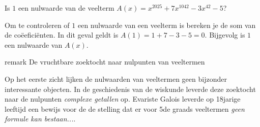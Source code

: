 \documentclass{ximera}
\begin{document}
\begin{exercise}
    Is \(1\) een nulwaarde van de veelterm \( A(x) = x^2025 + 7x^1042 - 3x^42 - 5\)? 
    \begin{oplossing}
    Om te controleren of \(1\) een nulwaarde van een veelterm is bereken je de som van de coëeficiënten. In dit geval geldt is \(A(1) = 1 + 7 - 3 - 5 = 0\). Bijgevolg is \(1\) een nulwaarde van \(A(x)\).  
    \end{oplossing}
\end{exercise}



\begin{expandable}{remark} De vruchtbare zoektocht naar nulpunten van veeltermen

    Op het eerste zicht lijken de nulwaarden van veeltermen geen bijzonder interessante objecten. In de geschiedenis van de wiskunde leverde deze zoektocht naar de nulpunten \textit{complexe getallen} op.  
    Evariste Galois leverde op 18jarige leeftijd een bewijs voor de de stelling dat er voor 5de graads veeltermen \textit{geen formule kan bestaan...}. 
    
\end{expandable}
\end{document}
